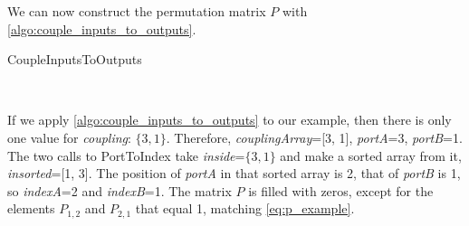 We can now construct the permutation matrix $P$ with \cref{algo:couple_inputs_to_outputs}.
\begin{algorithm}
    \caption{CoupleInputsToOutputs}
    \label{algo:couple_inputs_to_outputs}
    \begin{algorithmic}
         
         
        \EndFor
        \\ 
        \EndFunction
    \end{algorithmic}
\end{algorithm}

If we apply \cref{algo:couple_inputs_to_outputs} to our example, then there is only one value for \textit{coupling}: $\lbrace 3, 1\rbrace$.
Therefore, \textit{couplingArray}=[3, 1], \textit{portA}=3, \textit{portB}=1.
The two calls to PortToIndex take \textit{inside}=$\lbrace 3, 1\rbrace$ and make a sorted array from it, \textit{insorted}=[1, 3].
The position of \textit{portA} in that sorted array is 2, that of \textit{portB} is 1, so \textit{indexA}=2 and \textit{indexB}=1.
The matrix $P$ is filled with zeros, except for the elements $P_{1, 2}$ and $P_{2, 1}$ that equal 1, matching \cref{eq:p_example}.

